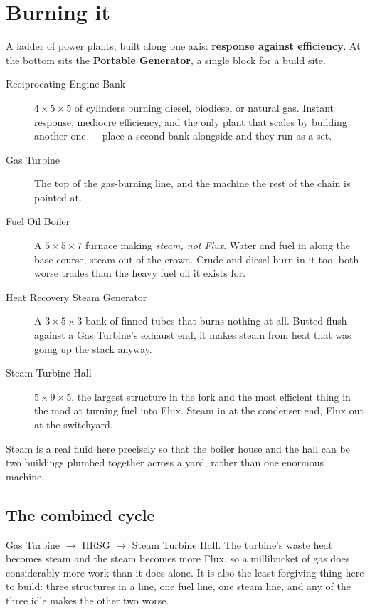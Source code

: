 \section{Burning it}

A ladder of power plants, built along one axis: \textbf{response against efficiency}. At the bottom
sits the \textbf{Portable Generator}, a single block for a build site.

\begin{description}
\item[Reciprocating Engine Bank] $4\times5\times5$ of cylinders burning diesel, biodiesel or
      natural gas. Instant response, mediocre efficiency, and the only plant that scales by
      building another one --- place a second bank alongside and they run as a set.
\item[Gas Turbine] The top of the gas-burning line, and the machine the rest of the chain is
      pointed at.
\item[Fuel Oil Boiler] A $5\times5\times7$ furnace making \emph{steam, not Flux}. Water and fuel in
      along the base course, steam out of the crown. Crude and diesel burn in it too, both worse
      trades than the heavy fuel oil it exists for.
\item[Heat Recovery Steam Generator] A $3\times5\times3$ bank of finned tubes that burns nothing at
      all. Butted flush against a Gas Turbine's exhaust end, it makes steam from heat that was
      going up the stack anyway.
\item[Steam Turbine Hall] $5\times9\times5$, the largest structure in the fork and the most
      efficient thing in the mod at turning fuel into Flux. Steam in at the condenser end, Flux out
      at the switchyard.
\end{description}

Steam is a real fluid here precisely so that the boiler house and the hall can be two buildings
plumbed together across a yard, rather than one enormous machine.

\subsection*{The combined cycle}

Gas Turbine $\rightarrow$ HRSG $\rightarrow$ Steam Turbine Hall. The turbine's waste heat becomes
steam and the steam becomes more Flux, so a millibucket of gas does considerably more work than it
does alone. It is also the least forgiving thing here to build: three structures in a line, one
fuel line, one steam line, and any of the three idle makes the other two worse.

